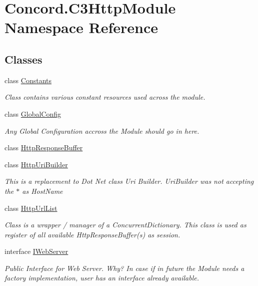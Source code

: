 \hypertarget{namespace_concord_1_1_c3_http_module}{}\section{Concord.\+C3\+Http\+Module Namespace Reference}
\label{namespace_concord_1_1_c3_http_module}
\subsection*{Classes}
\begin{DoxyCompactItemize}
\item 
class \mbox{\hyperlink{class_concord_1_1_c3_http_module_1_1_constants}{Constants}}
\begin{DoxyCompactList}\small\item\em Class contains various constant resources used across the module. \end{DoxyCompactList}\item 
class \mbox{\hyperlink{class_concord_1_1_c3_http_module_1_1_global_config}{Global\+Config}}
\begin{DoxyCompactList}\small\item\em Any Global Configuration accross the Module should go in here. \end{DoxyCompactList}\item 
class \mbox{\hyperlink{class_concord_1_1_c3_http_module_1_1_http_response_buffer}{Http\+Response\+Buffer}}
\item 
class \mbox{\hyperlink{class_concord_1_1_c3_http_module_1_1_http_uri_builder}{Http\+Uri\+Builder}}
\begin{DoxyCompactList}\small\item\em This is a replacement to Dot Net class Uri Builder. Uri\+Builder was not accepting the $\ast$ as Host\+Name \end{DoxyCompactList}\item 
class \mbox{\hyperlink{class_concord_1_1_c3_http_module_1_1_http_url_list}{Http\+Url\+List}}
\begin{DoxyCompactList}\small\item\em Class is a wrapper / manager of a Concurrent\+Dictionary. This class is used as register of all available Http\+Response\+Buffer(s) as session. \end{DoxyCompactList}\item 
interface \mbox{\hyperlink{interface_concord_1_1_c3_http_module_1_1_i_web_server}{I\+Web\+Server}}
\begin{DoxyCompactList}\small\item\em Public Interface for Web Server. Why? In case if in future the Module needs a factory implementation, user has an interface already available. \end{DoxyCompactList}\item 

\end{DoxyCompactItemize}
